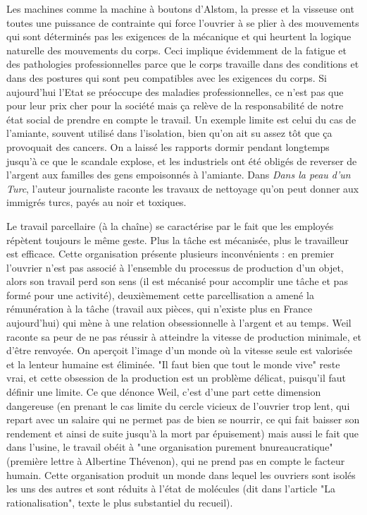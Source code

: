 \documentclass[a4paper,12pt]{book}
\begin{document}
\par Les machines comme la machine à boutons d'Alstom, la presse et la visseuse ont toutes une puissance de contrainte qui force l'ouvrier à se plier à des mouvements qui sont déterminés pas les exigences de la mécanique et qui heurtent la logique naturelle des mouvements du corps. Ceci implique évidemment de la fatigue et des pathologies professionnelles parce que le corps travaille dans des conditions et dans des postures qui sont peu compatibles avec les exigences du corps. Si aujourd'hui l'Etat se préoccupe des maladies professionnelles, ce n'est pas que pour leur prix cher pour la société mais ça relève de la responsabilité de notre état social de prendre en compte le travail. Un exemple limite est celui du cas de l'amiante, souvent utilisé dans l'isolation, bien qu'on ait su assez tôt que ça provoquait des cancers. On a laissé les rapports dormir pendant longtemps jusqu'à ce que le scandale explose, et les industriels ont été obligés de reverser de l'argent aux familles des gens empoisonnés à l'amiante. Dans \textit{Dans la peau d'un Turc}, l'auteur journaliste raconte les travaux de nettoyage qu'on peut donner aux immigrés turcs, payés au noir et toxiques.
\par Le travail parcellaire (à la chaîne) se caractérise par le fait que les employés répètent toujours le même geste. Plus la tâche est mécanisée, plus le travailleur est efficace. Cette organisation présente plusieurs inconvénients : en premier l'ouvrier n'est pas associé à l'ensemble du processus de production d'un objet, alors son travail perd son sens (il est mécanisé pour accomplir une tâche et pas formé pour une activité), deuxièmement cette parcellisation a amené la rémunération à la tâche (travail aux pièces, qui n'existe plus en France aujourd'hui) qui mène à une relation obsessionnelle à l'argent et au temps. Weil raconte sa peur de ne pas réussir à atteindre la vitesse de production minimale, et d'être renvoyée. On aperçoit l'image d'un monde où la vitesse seule est valorisée et la lenteur humaine est éliminée. "Il faut bien que tout le monde vive" reste vrai, et cette obsession de la production est un problème délicat, puisqu'il faut définir une limite. Ce que dénonce Weil, c'est d'une part cette dimension dangereuse (en prenant le cas limite du cercle vicieux de l'ouvrier trop lent, qui repart avec un salaire qui ne permet pas de bien se nourrir, ce qui fait baisser son rendement et ainsi de suite jusqu'à la mort par épuisement) mais aussi le fait que dans l'usine, le travail obéit à "une organisation purement bnureaucratique" (première lettre à Albertine Thévenon), qui ne prend pas en compte le facteur humain. Cette organisation produit un monde dans lequel les ouvriers sont isolés les uns des autres et sont réduits à l'état de molécules (dit dans l'article "La rationalisation", texte le plus substantiel du recueil).
\end{document}
